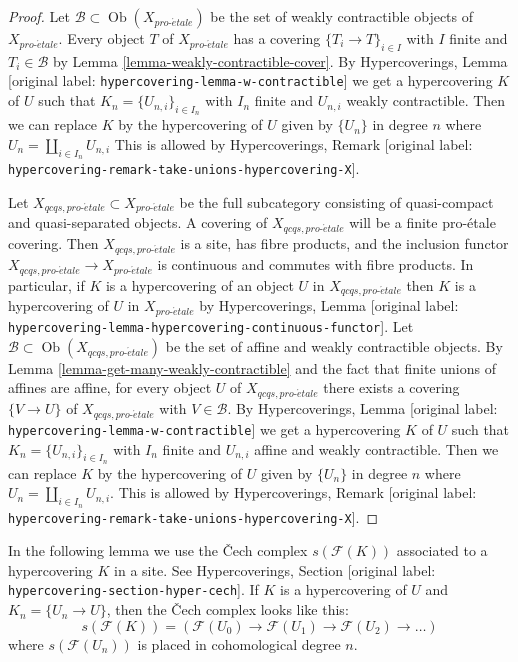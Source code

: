 \documentclass[10pt,a4paper]{article}
\theoremstyle{plain}
\theoremstyle{definition}
\theoremstyle{remark}
\numberwithin{equation}{subsection}
\def\Ob{\mathop{\mathrm{Ob}}\nolimits}
\def\proetale{{pro\text{-}\acute{e}tale}}
\begin{document}
\begin{proof}
Let $\mathcal{B} \subset \Ob(X_\proetale)$ be the set of weakly contractible
objects of $X_\proetale$. Every object $T$ of $X_\proetale$ has a
covering $\{T_i \to T\}_{i \in I}$ with $I$ finite and $T_i \in \mathcal{B}$ by
Lemma \ref{lemma-weakly-contractible-cover}.
By Hypercoverings, Lemma \textnormal{[original label: \nolinkurl{hypercovering-lemma-w-contractible}]}
we get a hypercovering $K$ of $U$ such that $K_n = \{U_{n, i}\}_{i \in I_n}$
with $I_n$ finite and $U_{n, i}$ weakly contractible.
Then we can replace $K$ by the hypercovering of $U$ given by $\{U_n\}$
in degree $n$ where $U_n = \coprod_{i \in I_n} U_{n, i}$
This is allowed by
Hypercoverings, Remark \textnormal{[original label: \nolinkurl{hypercovering-remark-take-unions-hypercovering-X}]}.

\medskip\noindent
Let $X_{qcqs, \proetale} \subset X_\proetale$ be the full subcategory
consisting of quasi-compact and quasi-separated objects.
A covering of $X_{qcqs, \proetale}$ will be a finite pro-\'etale covering.
Then $X_{qcqs, \proetale}$ is a site, has fibre products, and
the inclusion functor $X_{qcqs, \proetale} \to X_\proetale$ is continuous
and commutes with fibre products.
In particular, if $K$ is a hypercovering of an object $U$ in
$X_{qcqs, \proetale}$ then $K$ is a hypercovering of $U$ in $X_\proetale$
by Hypercoverings, Lemma
\textnormal{[original label: \nolinkurl{hypercovering-lemma-hypercovering-continuous-functor}]}.
Let $\mathcal{B} \subset \Ob(X_{qcqs, \proetale})$ be the set of
affine and weakly contractible objects. By 
Lemma \ref{lemma-get-many-weakly-contractible}
and the fact that finite unions of affines are affine,
for every object $U$ of $X_{qcqs, \proetale}$ there exists a covering
$\{V \to U\}$ of $X_{qcqs, \proetale}$ with $V \in \mathcal{B}$.
By Hypercoverings, Lemma \textnormal{[original label: \nolinkurl{hypercovering-lemma-w-contractible}]}
we get a hypercovering $K$ of $U$ such that $K_n = \{U_{n, i}\}_{i \in I_n}$
with $I_n$ finite and $U_{n, i}$ affine and weakly contractible.
Then we can replace $K$ by the hypercovering of $U$
given by $\{U_n\}$ in degree $n$ where
$U_n = \coprod_{i \in I_n} U_{n, i}$. This is allowed by
Hypercoverings, Remark \textnormal{[original label: \nolinkurl{hypercovering-remark-take-unions-hypercovering-X}]}.
\end{proof}

\noindent
In the following lemma we use the {\v C}ech complex $s(\mathcal{F}(K))$
associated to a hypercovering $K$ in a site. See
Hypercoverings, Section \textnormal{[original label: \nolinkurl{hypercovering-section-hyper-cech}]}.
If $K$ is a hypercovering of $U$ and $K_n = \{U_n \to U\}$, then
the {\v C}ech complex looks like this:
$$
s(\mathcal{F}(K)) =
\left(
\mathcal{F}(U_0) \to \mathcal{F}(U_1) \to \mathcal{F}(U_2) \to \ldots
\right)
$$
where $s(\mathcal{F}(U_n))$ is placed in cohomological degree $n$.
\end{document}
